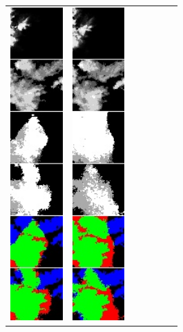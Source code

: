\begin{figure}[h]
\begin{tabular}{lllllll}
\includegraphics[width=20mm]{abb/prediction/100_cat_maxCont}&
\includegraphics[width=20mm]{abb/prediction/101_cat_maxCont}&

\end{tabular}
\end{figure}
